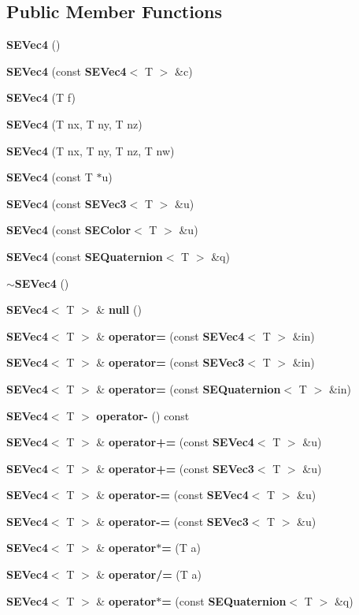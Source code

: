 \subsection*{Public Member Functions}
\begin{DoxyCompactItemize}
\item 
{\bf S\+E\+Vec4} ()
\item 
{\bf S\+E\+Vec4} (const {\bf S\+E\+Vec4}$<$ T $>$ \&c)
\item 
{\bf S\+E\+Vec4} (T f)
\item 
{\bf S\+E\+Vec4} (T nx, T ny, T nz)
\item 
{\bf S\+E\+Vec4} (T nx, T ny, T nz, T nw)
\item 
{\bf S\+E\+Vec4} (const T $\ast$u)
\item 
{\bf S\+E\+Vec4} (const {\bf S\+E\+Vec3}$<$ T $>$ \&u)
\item 
{\bf S\+E\+Vec4} (const {\bf S\+E\+Color}$<$ T $>$ \&u)
\item 
{\bf S\+E\+Vec4} (const {\bf S\+E\+Quaternion}$<$ T $>$ \&q)
\item 
{\bf $\sim$\+S\+E\+Vec4} ()
\item 
{\bf S\+E\+Vec4}$<$ T $>$ \& {\bf null} ()
\item 
{\bf S\+E\+Vec4}$<$ T $>$ \& {\bf operator=} (const {\bf S\+E\+Vec4}$<$ T $>$ \&in)
\item 
{\bf S\+E\+Vec4}$<$ T $>$ \& {\bf operator=} (const {\bf S\+E\+Vec3}$<$ T $>$ \&in)
\item 
{\bf S\+E\+Vec4}$<$ T $>$ \& {\bf operator=} (const {\bf S\+E\+Quaternion}$<$ T $>$ \&in)
\item 
{\bf S\+E\+Vec4}$<$ T $>$ {\bf operator-\/} () const 
\item 
{\bf S\+E\+Vec4}$<$ T $>$ \& {\bf operator+=} (const {\bf S\+E\+Vec4}$<$ T $>$ \&u)
\item 
{\bf S\+E\+Vec4}$<$ T $>$ \& {\bf operator+=} (const {\bf S\+E\+Vec3}$<$ T $>$ \&u)
\item 
{\bf S\+E\+Vec4}$<$ T $>$ \& {\bf operator-\/=} (const {\bf S\+E\+Vec4}$<$ T $>$ \&u)
\item 
{\bf S\+E\+Vec4}$<$ T $>$ \& {\bf operator-\/=} (const {\bf S\+E\+Vec3}$<$ T $>$ \&u)
\item 
{\bf S\+E\+Vec4}$<$ T $>$ \& {\bf operator$\ast$=} (T a)
\item 
{\bf S\+E\+Vec4}$<$ T $>$ \& {\bf operator/=} (T a)
\item 
{\bf S\+E\+Vec4}$<$ T $>$ \& {\bf operator$\ast$=} (const {\bf S\+E\+Quaternion}$<$ T $>$ \&q)

\end{DoxyCompactItemize}
